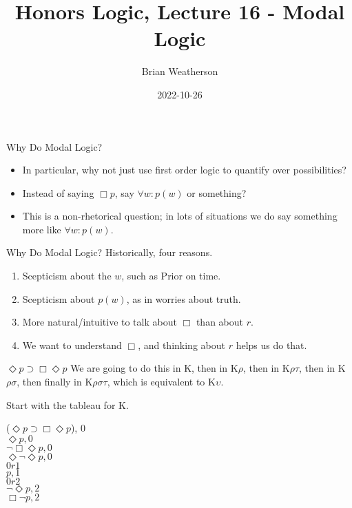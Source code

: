 \documentclass[
  14pt,
  letterpaper,
  ignorenonframetext,
]{beamer}
\title{Honors Logic, Lecture 16 - Modal Logic}
\author{Brian Weatherson}
\date{2022-10-26}
\providecommand{\tightlist}{%
  \setlength{\itemsep}{0pt}\setlength{\parskip}{0pt}}\usepackage{longtable,booktabs,array}
\begin{document}
\frame{\titlepage}
\ifdefined\Shaded\renewenvironment{Shaded}{\begin{tcolorbox}[sharp corners, boxrule=0pt, breakable, enhanced, interior hidden, borderline west={3pt}{0pt}{shadecolor}, frame hidden]}{\end{tcolorbox}}\fi

\begin{frame}{Why Do Modal Logic?}
\protect\hypertarget{why-do-modal-logic}{}
\begin{itemize}
\tightlist
\item
  In particular, why not just use first order logic to quantify over
  possibilities?
\item
  Instead of saying \(\Box p\), say \(\forall w: p(w)\) or something?
\item
  This is a non-rhetorical question; in lots of situations we do say
  something more like \(\forall w: p(w)\).
\end{itemize}
\end{frame}

\begin{frame}{Why Do Modal Logic?}
\protect\hypertarget{why-do-modal-logic-1}{}
Historically, four reasons.

\begin{enumerate}[<+->]
\tightlist
\item
  Scepticism about the \(w\), such as Prior on time.
\item
  Scepticism about \(p(w)\), as in worries about truth.
\item
  More natural/intuitive to talk about \(\Box\) than about \(r\).
\item
  We want to understand \(\Box\), and thinking about \(r\) helps us do
  that.
\end{enumerate}
\end{frame}

\begin{frame}{\(\Diamond p \supset \Box \Diamond p\)}
\protect\hypertarget{diamond-p-supset-box-diamond-p}{}
We are going to do this in K, then in K\(\rho\), then in K\(\rho \tau\),
then in K\(\rho \sigma\), then finally in K\(\rho \sigma \tau\), which
is equivalent to K\(\upsilon\).
\end{frame}

\begin{frame}
Start with the tableau for K.

\begin{center}
\neg($\Diamond p \supset \Box \Diamond p$), 0 \\
$\Diamond p, 0$ \\
$\neg \Box \Diamond p, 0$ \\
$\Diamond \neg \Diamond p, 0$ \\
$0r1$ \\
$p, 1$ \\
$0r2$ \\
$\neg \Diamond p, 2$ \\
$\Box \neg p, 2$
\end{center}
\end{frame}
\end{document}
